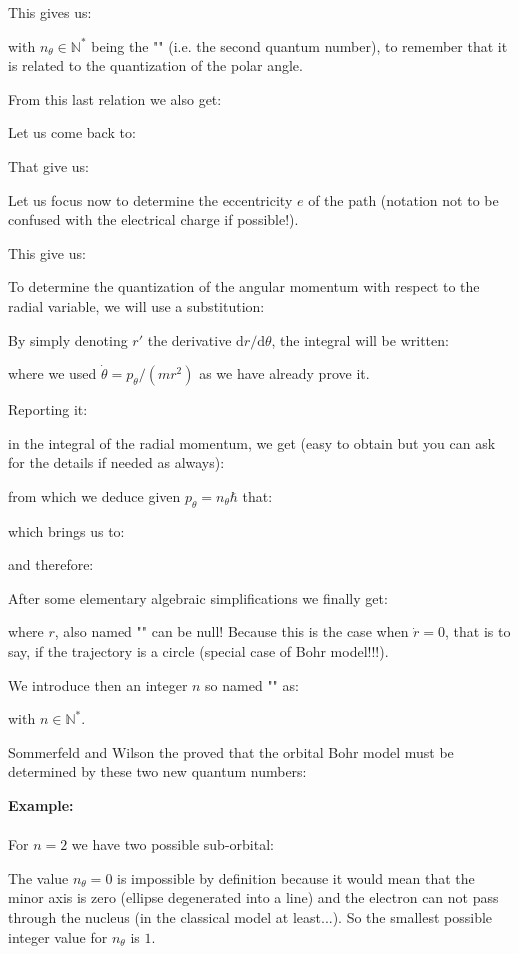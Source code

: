 	This gives us:
	
	with $n_\theta \in \mathbb{N}^*$ being the "" (i.e. the second quantum number), to remember that it is related to the quantization of the polar angle.
	
	From this last relation we also get:
	
	Let us come back to:
	
	That give us:
	
	Let us focus now to determine the eccentricity $e$ of the path (notation not to be confused with the electrical charge if possible!).
	
	This give us:
	
	To determine the quantization of the angular momentum with respect to the radial variable, we will use a substitution:
	
	By simply denoting $r'$ the derivative $\mathrm{d}r/\mathrm{d}\theta$, the integral will be written:
	
	where we used $\dot{\theta}=p_\theta/(mr^2)$ as we have already prove it.
	
	Reporting it:
	
	in the integral of the radial momentum, we get (easy to obtain but you can ask for the details if needed as always):
	
	from which we deduce given $p_\theta=n_\theta\hbar$ that:
	
	which brings us to:
	
	and therefore:
	
	After some elementary algebraic simplifications we finally get:
	
	where $r$, also named "" can be null! Because this is the case when $\dot{r}=0$, that is to say, if the trajectory is a circle (special case of Bohr model!!!).
	
	We introduce then an integer $n$ so named "" as:
	
	with $n\in \mathbb{N}^*$.
	
	Sommerfeld and Wilson the proved that the orbital Bohr model must be determined by these two new quantum numbers:
	\begin{tcolorbox}[colframe=black,colback=white,sharp corners]
	\textbf{{\Large {}}Example:}\\\\
	For $n=2$ we have two possible sub-orbital:
	
	\end{tcolorbox}
	The value $n_\theta=0$ is impossible by definition because it would mean that the minor axis is zero (ellipse degenerated into a line) and the electron can not pass through the nucleus (in the classical model at least...). So the smallest possible integer value for $n_\theta$ is $1$.
	
